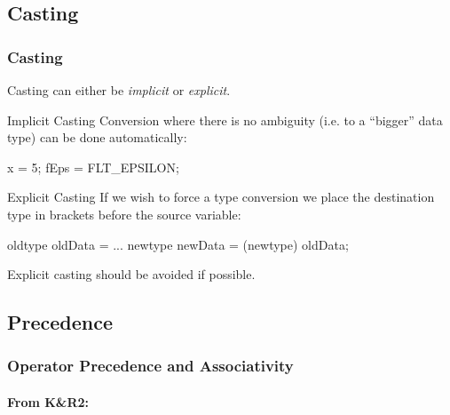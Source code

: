 \documentclass[smaller,handout,table]{beamer}
\begin{document}
\subsection{Casting}
\begin{frame}[fragile]
\frametitle{Casting}
Casting can either be \emph{implicit} or \emph{explicit}.
\begin{block}{Implicit Casting}
Conversion where there is no ambiguity (i.e. to a ``bigger'' data type) can be done automatically:
\begin{semiverbatim}
\small{} x = 5; 
 fEps = FLT\_EPSILON; 
\end{semiverbatim}
\end{block}

\begin{block}{Explicit Casting}
If we wish to force a type conversion we place the destination type in brackets before the source variable:
\begin{semiverbatim}
oldtype oldData = ...
newtype newData = (newtype) oldData;
\end{semiverbatim}
Explicit casting should be avoided if possible.
\end{block}
\end{frame}


\subsection{Precedence}
\begin{frame}
\frametitle{Operator Precedence and Associativity}
\framesubtitle{From K\&R2:}
\begin{columns}
\begin{column}{9cm}
\end{column}
\end{columns}
\end{frame}
\end{document}
